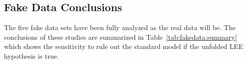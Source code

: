 \subsection{Fake Data Conclusions}

The five fake data sets have been fully analyzed as the real data will be. The conclusions of these studies are summarized in Table~\ref{tab:fakedata:summary} which shows the sensitivity to rule out the standard model if the unfolded LEE hypothesis is true.

